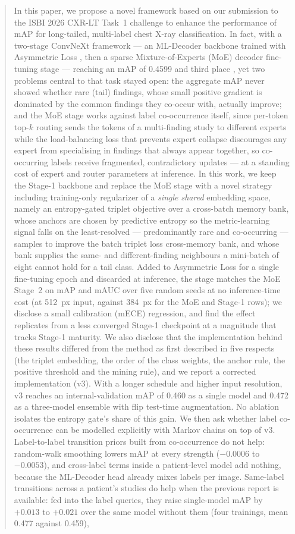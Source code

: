 \documentclass[conference]{IEEEtran}
\begin{document}
\begin{abstract}
In this paper, we propose a novel framework based on our submission to the ISBI 2026 CXR-LT Task~1 challenge \cite{b12} to enhance the performance of mAP for long-tailed, multi-label chest X-ray classification. In fact, with a two-stage ConvNeXt framework --- an ML-Decoder backbone trained with Asymmetric Loss
, then a sparse Mixture-of-Experts (MoE) decoder fine-tuning stage --- reaching an mAP of 0.4599 and third place 
, yet two problems central to that task stayed open: the aggregate mAP never showed whether rare (tail) findings, whose small positive gradient is dominated by the common findings they co-occur with, actually improve; and the MoE stage works against label co-occurrence itself, since per-token top-$k$ routing sends the tokens of a multi-finding study to different experts while the load-balancing loss that prevents expert collapse discourages any expert from specialising in findings that always appear together, so co-occurring labels receive fragmented, contradictory updates --- at a standing cost of expert and router parameters at inference. In this work, we keep the Stage-1 backbone and replace the MoE stage with a novel strategy including training-only regularizer of a \emph{single shared} embedding space, namely an entropy-gated triplet objective over a cross-batch memory bank, whose anchors are chosen by predictive entropy so the metric-learning signal falls on the least-resolved --- predominantly rare and co-occurring --- samples to improve the batch triplet loss cross-memory bank, and whose bank supplies the same- and different-finding neighbours a mini-batch of eight cannot hold for a tail class. Added to Asymmetric Loss for a single fine-tuning epoch and discarded at inference, the stage matches the MoE Stage~2 on mAP and mAUC over five random seeds at no inference-time cost (at 512~px input, against 384~px for the MoE and Stage-1 rows); we disclose a small calibration (mECE) regression, and find the effect replicates from a less converged Stage-1 checkpoint at a magnitude that tracks Stage-1 maturity. We also disclose that the implementation behind these results differed from the method as first described in five respects (the triplet embedding, the order of the class weights, the anchor rule, the positive threshold and the mining rule), and we report a corrected implementation (v3). With a longer schedule and higher input resolution, v3 reaches an internal-validation mAP of 0.460 as a single model and 0.472 as a three-model ensemble with flip test-time augmentation. No ablation isolates the entropy gate's share of this gain. We then ask whether label co-occurrence can be modelled explicitly with Markov chains on top of v3. Label-to-label transition priors built from co-occurrence do not help: random-walk smoothing lowers mAP at every strength ($-0.0006$ to $-0.0053$), and cross-label terms inside a patient-level model add nothing, because the ML-Decoder head already mixes labels per image. Same-label transitions across a patient's studies do help when the previous report is available: fed into the label queries, they raise single-model mAP by $+0.013$ to $+0.021$ over the same model without them (four trainings, mean 0.477 against 0.459), 
\end{abstract}
\end{document}
